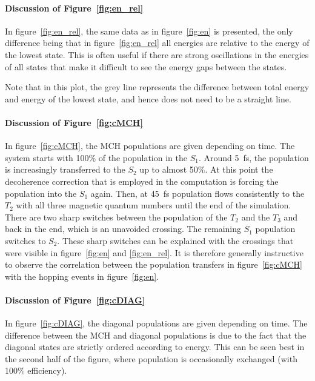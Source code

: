 \documentclass[a4paper,11pt,DIV=15,openany]{scrbook}
\begin{document}
\paragraph{Discussion of Figure~\ref{fig:en_rel}}

In figure~\ref{fig:en_rel}, the same data as in figure~\ref{fig:en} is presented, the only difference being that in figure~\ref{fig:en_rel} all energies are relative to the energy of the lowest state.
This is often useful if there are strong oscillations in the energies of all states that make it difficult to see the energy gaps between the states.

Note that in this plot, the grey line represents the difference between total energy and energy of the lowest state, and hence does not need to be a straight line.

\paragraph{Discussion of Figure~\ref{fig:cMCH}}

In figure~\ref{fig:cMCH}, the MCH populations are given depending on time. 
The system starts with 100\% of the population in the $S_1$. 
Around 5~fs, the population is increasingly transferred to the $S_2$ up to almost 50\%. 
At this point the decoherence correction that is employed in the computation is forcing the population into the $S_1$ again.
Then, at 45~fs population flows consistently to the $T_2$ with all three magnetic quantum numbers until the end of the simulation. 
There are two sharp switches between the population of the $T_2$ and the $T_3$ and back in the end, which is an unavoided crossing. 
The remaining $S_1$ population switches to $S_2$. These sharp switches can be explained with the crossings that were visible in figure~\ref{fig:en} and \ref{fig:en_rel}. 
It is therefore generally instructive to observe the correlation between the population transfers in figure~\ref{fig:cMCH} with the hopping events in figure~\ref{fig:en}.


\paragraph{Discussion of Figure~\ref{fig:cDIAG}}

In figure~\ref{fig:cDIAG}, the diagonal populations are given depending on time. 
The difference between the MCH and diagonal populations is due to the fact that the diagonal states are strictly ordered according to energy.
This can be seen best in the second half of the figure, where population is occasionally exchanged (with 100\% efficiency).
\end{document}
